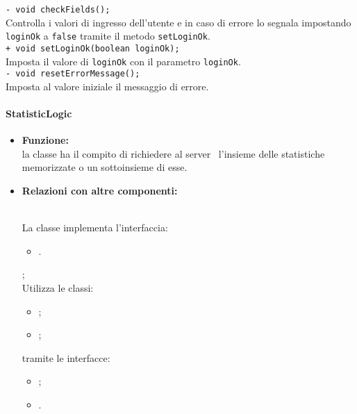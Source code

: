 {{\begin{sloppypar}
{{\begin{itemize}
{					\texttt{- void checkFields();}\\
						Controlla i valori di ingresso dell’utente e in caso di errore lo segnala impostando \texttt{loginOk} a \texttt{false} tramite il metodo \texttt{setLoginOk}.\\

					\texttt{+ void setLoginOk(boolean loginOk);}\\
						Imposta il valore di \texttt{loginOk} con il parametro \texttt{loginOk}.\\

					\texttt{- void resetErrorMessage();}\\
						Imposta al valore iniziale il messaggio di errore.\\
					}
				\end{itemize}
			}




		\paragraph{StatisticLogic}\label{par:StatisticLogic}{
			\begin{itemize}

				\item[] \textbf{Funzione:}\\
				la classe ha il compito di richiedere al server\g~ l'insieme delle statistiche memorizzate o un sottoinsieme di esse.\\
			
				\item[] \textbf{Relazioni con altre componenti:}{\\
					La classe implementa l'interfaccia:
					\begin{itemize}
						\item[] .
					\end{itemize};\\
					Utilizza le classi:
					\begin{itemize}
						\item[] ;
						\item[] ;
					\end{itemize}
					tramite le interfacce:
					\begin{itemize}
						\item[] ;
						\item[] .\\
					\end{itemize}
				}
			

\end{itemize}}}
\end{sloppypar}}}
